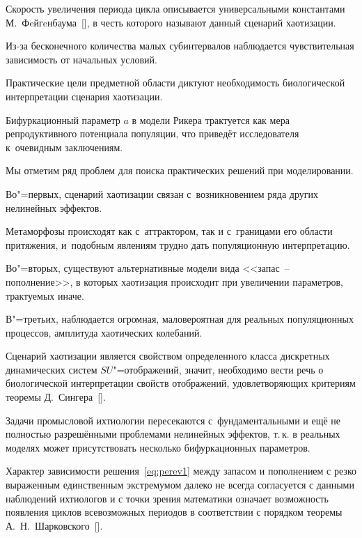Скорость увеличения периода цикла описывается универсальными константами М.~Фeйгeнбаума~[], в честь которого называют данный сценарий хаотизации. 

Из-за бесконечного количества малых субинтервалов наблюдается чувствительная зависимость от начальных условий. 

Практические цели предметной области диктуют необходимость биологической интерпретации сценария хаотизации. 

Бифуркационный параметр $a$ в модели Рикера трактуется как мера репродуктивного потенциала популяции, что приведёт исследователя к~очевидным заключениям. 

Мы отметим ряд проблем для поиска практических решений при моделировании.

Во"=первых, сценарий хаотизации связан с~возникновением ряда других нелинейных эффектов. 

Метаморфозы происходят как с~аттрактором, так и с~границами его области притяжения, и~подобным явлениям трудно дать популяционную интерпретацию. 

Во"=вторых, существуют альтернативные модели вида <<запас~-- пополнение>>, в которых хаотизация происходит при увеличении параметров, трактуемых иначе. 

В"=третьих, наблюдается огромная, маловероятная для реальных популяционных процессов, амплитуда хаотических колебаний. 

Сценарий хаотизации является свойством определенного класса дискретных динамических систем $SU$"=отображений, значит, необходимо вести речь о биологической интерпретации свойств отображений, удовлетворяющих критериям теоремы Д.~Сингера~[]. 

Задачи промысловой ихтиологии пересекаются с~фундаментальными и ещё не полностью разрешёнными проблемами нелинейных эффектов, т.\,к. в реальных моделях может присутствовать несколько бифуркационных параметров.





\smallskip








Характер зависимости решения~\eqref{eq:perev1} между запасом и пополнением с резко выраженным единственным экстремумом далеко не всегда согласуется с данными наблюдений ихтиологов и с точки зрения математики означает возможность появления циклов всевозможных периодов в соответствии с порядком теоремы А.~Н.~Шарковского~[].

